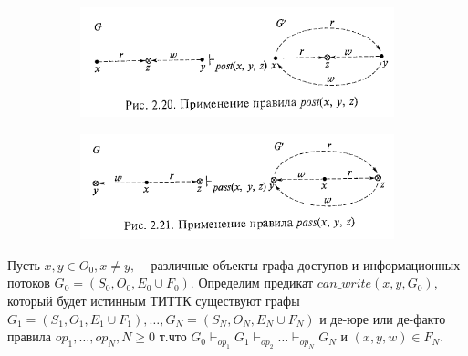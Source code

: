 \begin{figure}[H]
	\centering
	\begin{subfigure}[b]{0.4\textwidth}
		\includegraphics[width=\textwidth]{img/6.png}
		\captionsetup{labelformat=empty}
	\end{subfigure}
	\begin{subfigure}[b]{0.4\textwidth}
		\includegraphics[width=\textwidth]{img/7.png}
		\captionsetup{labelformat=empty}
	\end{subfigure}
\end{figure}

\begin{defs}
	Пусть $x, y \in O_0, x \neq y,$ -- различные объекты графа доступов и информационных потоков $G_0 = (S_0, O_0, E_0 \cup F_0).$
	Определим предикат $can\_write(x, y, G_0)$, который будет истинным ТИТТК существуют графы
	$G_1 = (S_1, O_1, E_1 \cup F_1), \ldots, G_N = (S_N, O_N, E_N \cup F_N)$ и де-юре или де-факто правила
	$op_1, \ldots, op_N, N \geqslant 0 $ т.что $G_0 \vdash_{op_1} G_1 \vdash_{op_2} \ldots \vdash_{op_N} G_N$
	и $(x, y, w) \in F_N$.
\end{defs}

